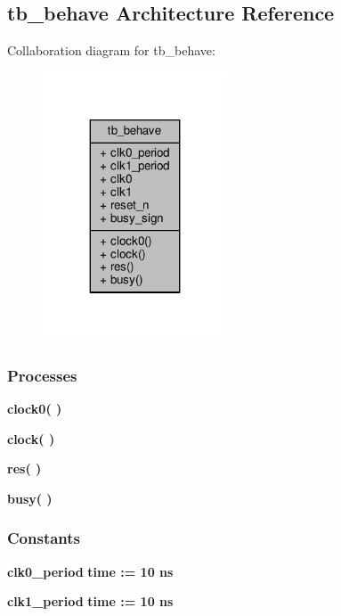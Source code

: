 \subsection{tb\+\_\+behave Architecture Reference}
\label{classbusy__delay__tb_1_1tb__behave}


Collaboration diagram for tb\+\_\+behave\+:\nopagebreak
\begin{figure}[H]
\begin{center}
\leavevmode
\includegraphics[width=155pt]{de/db8/classbusy__delay__tb_1_1tb__behave__coll__graph}
\end{center}
\end{figure}
\subsubsection*{Processes}
 \begin{DoxyCompactItemize}
\item 
{\bf clock0}{\bfseries  (  )}
\item 
{\bf clock}{\bfseries  (  )}
\item 
{\bf res}{\bfseries  (  )}
\item 
{\bf busy}{\bfseries  (  )}
\end{DoxyCompactItemize}
\subsubsection*{Constants}
 \begin{DoxyCompactItemize}
\item 
{\bf clk0\+\_\+period} {\bfseries \textcolor{comment}{time}\textcolor{vhdlchar}{ }\textcolor{vhdlchar}{ }\textcolor{vhdlchar}{\+:}\textcolor{vhdlchar}{=}\textcolor{vhdlchar}{ }\textcolor{vhdlchar}{ }\textcolor{vhdlchar}{ } \textcolor{vhdldigit}{10} \textcolor{vhdlchar}{ }\textcolor{vhdlchar}{ns}\textcolor{vhdlchar}{ }} 
\item 
{\bf clk1\+\_\+period} {\bfseries \textcolor{comment}{time}\textcolor{vhdlchar}{ }\textcolor{vhdlchar}{ }\textcolor{vhdlchar}{\+:}\textcolor{vhdlchar}{=}\textcolor{vhdlchar}{ }\textcolor{vhdlchar}{ }\textcolor{vhdlchar}{ } \textcolor{vhdldigit}{10} \textcolor{vhdlchar}{ }\textcolor{vhdlchar}{ns}\textcolor{vhdlchar}{ }} 
\end{DoxyCompactItemize}
